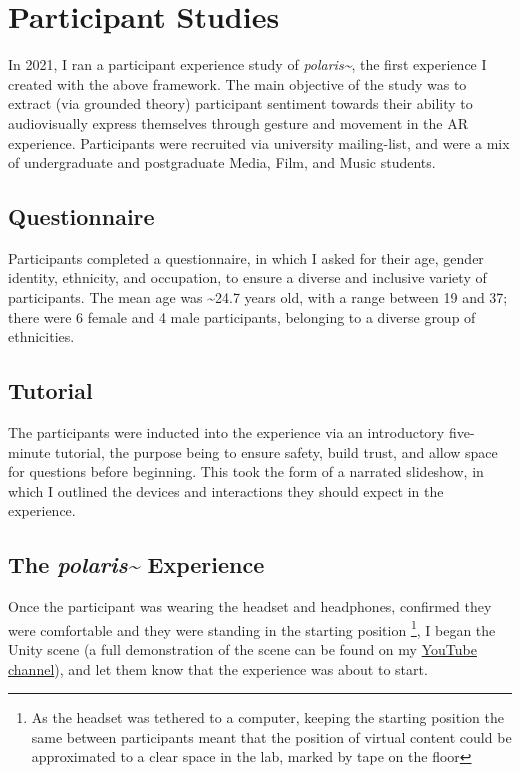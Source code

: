 \section{Participant Studies}\label{sec: polaris-study}
In 2021, I ran a participant experience study of \textit{polaris\textasciitilde{}}, the first experience I created with the above framework. The main objective of the study was to extract (via grounded theory) participant sentiment towards their ability to audiovisually express themselves through gesture and movement in the AR experience. Participants were recruited via university mailing-list, and were a mix of undergraduate and postgraduate Media, Film, and Music students.

\subsection{Questionnaire}\label{sec: polaris-study-questionnaire}
Participants completed a questionnaire, in which I asked for their age, gender identity, ethnicity, and occupation, to ensure a diverse and inclusive variety of participants. The mean age was \textasciitilde{}24.7 years old, with a range between 19 and 37; there were 6 female and 4 male participants, belonging to a diverse group of ethnicities.

\subsection{Tutorial}\label{sec: polaris-study-tutorial}
The participants were inducted into the experience via an introductory five-minute tutorial, the purpose being to ensure safety, build trust, and allow space for questions before beginning. This took the form of a narrated slideshow, in which I outlined the devices and interactions they should expect in the experience.

\subsection{The \textit{polaris\textasciitilde{}} Experience}\label{sec: polaris-study-experience}
Once the participant was wearing the headset and headphones, confirmed they were comfortable and they were standing in the starting position \footnote{As the headset was tethered to a computer, keeping the starting position the same between participants meant that the position of virtual content could be approximated to a clear space in the lab, marked by tape on the floor}, I began the Unity scene (a full demonstration of the scene can be found on my \href{https://youtu.be/lCBgMs8ULj0}{YouTube channel}), and let them know that the experience was about to start.

